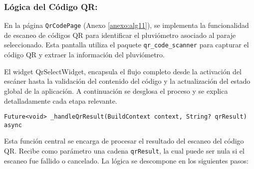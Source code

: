 \subsubsection*{Lógica del Código QR:}

En la página \texttt{QrCodePage} (Anexo \ref{anexo:alg11}), se implementa la funcionalidad de escaneo de códigos QR para identificar el pluviómetro asociado al paraje seleccionado. Esta pantalla utiliza el paquete \texttt{qr\_code\_scanner} para capturar el código QR y extraer la información del pluviómetro.



El widget QrSelectWidget, encapsula el flujo completo desde la activación del escáner hasta la validación del contenido del código y la actualización del estado global de la aplicación. A continuación se desglosa el proceso y se explica detalladamente cada etapa relevante.

\begin{verbatim}
Future<void> _handleQrResult(BuildContext context, String? qrResult) async
\end{verbatim}

Esta función central se encarga de procesar el resultado del escaneo del código QR. Recibe como parámetro una cadena \texttt{qrResult}, la cual puede ser nula si el escaneo fue fallido o cancelado. La lógica se descompone en los siguientes pasos:

